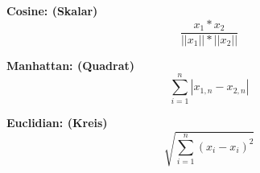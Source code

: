 \begin{minipage}{0,3\linewidth}
	\textbf{Cosine: (Skalar)}
\[ \frac{x_{1}*x_{2}}{||x_{1}||*||x_{2}||} \] 	 
\end{minipage}
\begin{minipage}{0,3\linewidth}
	\textbf{Manhattan: (Quadrat)}
	\[ \sum_{i=1}^{n} |x_{1,n} - x_{2,n}|\]  
\end{minipage}
\begin{minipage}{0,5\linewidth}
	\textbf{Euclidian: (Kreis)}
 \[ \sqrt{\sum_{i=1}^n (x_{i} - x_{i})^2} \]
\end{minipage}



 
 
 
 
 
 
